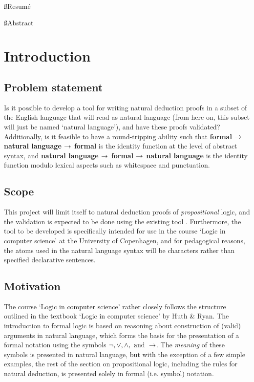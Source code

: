 \documentclass[a4paper]{article}
\title{\tit}
\begin{document}
\begin{titlepage}
\maketitle
\thispagestyle{empty}
\end{titlepage}

\tableofcontents
\thispagestyle{empty}
\pagebreak
\lstlistoflistings
{}

\ss{Resumé}

\ss{Abstract}

\section{Introduction} %
\subsection{Problem statement}
    Is it possible to develop a tool for writing natural deduction proofs
    in a subset of the English language that will read as natural language
    (from here on, this subset will just be named `natural language'),
    and have these proofs validated? Additionally, is it feasible to have
    a round-tripping ability such that {\bf formal $\rightarrow$ natural language
    $\rightarrow$ formal} is the identity function at the level of abstract syntax,
    and {\bf natural language $\rightarrow$ formal $\rightarrow$ natural language} is the
    identity function modulo lexical aspects such as whitespace and
    punctuation.

\subsection{Scope}
    This project will limit itself to natural deduction proofs of
    \emph{propositional} logic, and the validation is expected to be done
    using the existing tool \cite{box}. Furthermore, the tool
    to be developed is specifically intended for use in the course `Logic
    in computer science' at the University of Copenhagen, and for  
    pedagogical reasons, the atoms used in the natural language syntax
    will be characters rather than specified declarative sentences.

\subsection{Motivation}
    The course `Logic in computer science' rather closely follows the 
    structure outlined in the textbook `Logic in computer science' by
    Huth \& Ryan\cite{hr}. The introduction to formal logic is based on
    reasoning about construction of (valid) arguments in natural 
    language\cite[pp.~1-2]{hr}, which forms the basis for the presentation
    of a formal notation using the symbols 
    \(\neg, \lor, \land, \textnormal{ and } \rightarrow\)\cite[p.~4]{hr}. 
    The \emph{meaning} of these symbols is presented in natural language,
    but with the exception of a few simple examples, the rest of the section 
    on propositional logic, including the rules for natural deduction,
    is presented solely in formal (i.e. symbol) notation.
\end{document}
